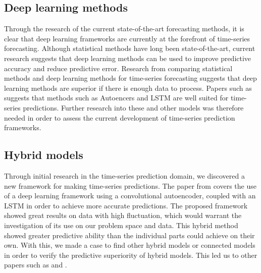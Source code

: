\subsection{Deep learning methods}
Through the research of the current state-of-the-art forecasting methods,
it is clear that deep learning frameworks are currently at the forefront of time-series forecasting.
Although statistical methods have long been state-of-the-art, current research suggests that deep learning methods can be used to improve predictive accuracy and reduce predictive error.
Research from \cite{Makridakis2018} comparing statistical methods and deep learning methods for time-series forecasting suggests that deep learning methods are superior if there is enough data to process.
Papers such as \cite{Laptev} suggests that methods such as Autoencers and LSTM are well suited for time-series predictions.
Further research into these and other models was therefore needed in order to assess the current development of time-series prediction frameworks.


\subsection{Hybrid models}
Through initial research in the time-series prediction domain,
we discovered a new framework for making time-series predictions.
The paper from \cite{Zhao2019} covers the use of a deep learning framework using a convolutional autoencoder,
coupled with an LSTM in order to achieve more accurate predictions.
The proposed framework showed great results on data with high fluctuation,
which would warrant the investigation of its use on our problem space and data.
This hybrid method showed greater predictive ability than the individual parts could achieve on their own.
With this, we made a case to find other hybrid models or connected models in order to verify the predictive superiority of hybrid models.
This led us to other papers such as \cite{Khan2020} and \cite{Bowen2020}.




\iffalse

